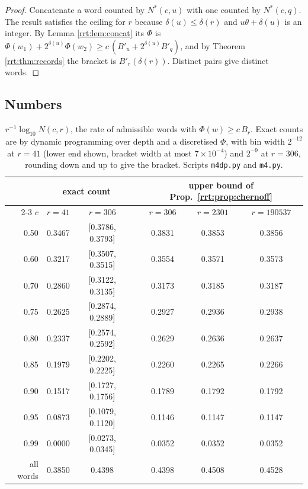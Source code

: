 \begin{proof}
Concatenate a word counted by $N^*(c,u)$ with one counted by $N^*(c,q)$. The result satisfies the ceiling for $r$ because $\delta(u)\le\delta(r)$ and $u\theta+\delta(u)$ is an integer. By Lemma \ref{rrt:lem:concat} its $\Phi$ is $\Phi(w_1)+2^{\delta(u)}\Phi(w_2)\ge c\,(B'_u+2^{\delta(u)}B'_q)$, and by Theorem \ref{rrt:thm:records} the bracket is $B'_r(\delta(r))$. Distinct pairs give distinct words.
\end{proof}

\subsection{Numbers}

\begin{table}[t]
\centering
\small
\setlength{\tabcolsep}{4pt}
\begin{tabular}{rcccccc}
\toprule
 & \multicolumn{2}{c}{exact count} & & \multicolumn{3}{c}{upper bound of Prop.~\ref{rrt:prop:chernoff}}\\
\cmidrule{2-3}\cmidrule{5-7}
$c$ & $r=41$ & $r=306$ & & $r=306$ & $r=2301$ & $r=190537$\\
\midrule
0.50 & 0.3467 & [0.3786, 0.3793] & & 0.3831 & 0.3853 & 0.3856\\
0.60 & 0.3217 & [0.3507, 0.3515] & & 0.3554 & 0.3571 & 0.3573\\
0.70 & 0.2860 & [0.3122, 0.3135] & & 0.3173 & 0.3185 & 0.3187\\
0.75 & 0.2625 & [0.2874, 0.2889] & & 0.2927 & 0.2936 & 0.2938\\
0.80 & 0.2337 & [0.2574, 0.2592] & & 0.2629 & 0.2636 & 0.2637\\
0.85 & 0.1979 & [0.2202, 0.2225] & & 0.2260 & 0.2265 & 0.2266\\
0.90 & 0.1517 & [0.1727, 0.1756] & & 0.1789 & 0.1792 & 0.1792\\
0.95 & 0.0873 & [0.1079, 0.1120] & & 0.1146 & 0.1147 & 0.1147\\
0.99 & 0.0000 & [0.0273, 0.0345] & & 0.0352 & 0.0352 & 0.0352\\
\midrule
all words & 0.3850 & 0.4398 & & 0.4398 & 0.4508 & 0.4528\\
\bottomrule
\end{tabular}
\caption{$r^{-1}\log_{10}N(c,r)$, the rate of admissible words with $\Phi(w)\ge c\,B_r$. Exact counts are by dynamic programming over depth and a discretised $\Phi$, with bin width $2^{-12}$ at $r=41$ (lower end shown, bracket width at most $7\times10^{-4}$) and $2^{-9}$ at $r=306$, rounding down and up to give the bracket. Scripts \texttt{m4dp.py} and \texttt{m4.py}.}
\label{rrt:tab:rho}
\end{table}

